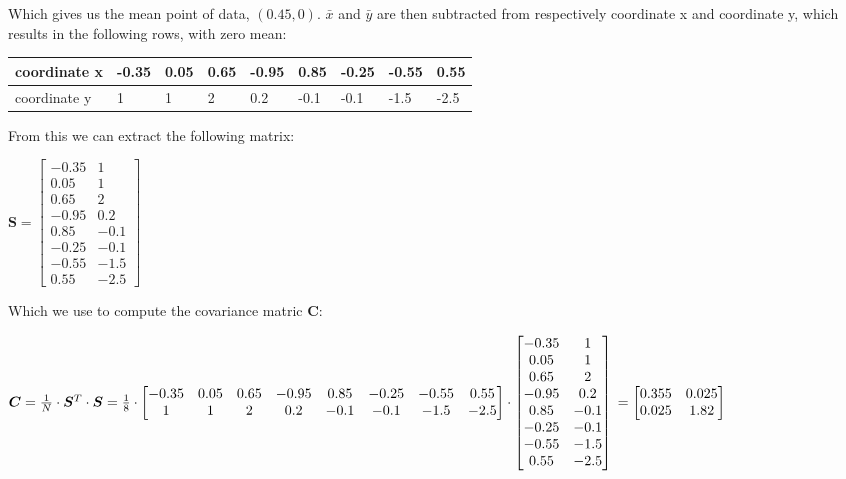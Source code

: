 \documentclass{report}
\begin{document}
\noindent Which gives us the mean point of data, $(0.45, 0)$. $\bar{x}$ and $\bar{y}$ are then subtracted from respectively coordinate x and coordinate y, which results in the following rows, with zero mean:
\begin{center}
    \begin{tabular}{|l|l|l|l|l|l|l|l|l|}
        \hline
        coordinate x & -0.35 & 0.05 & 0.65 & -0.95 & 0.85 & -0.25 & -0.55 & 0.55 \\
        \hline
        coordinate y & 1 & 1 & 2 & 0.2 & -0.1 & -0.1 & -1.5 & -2.5 \\
        \hline
    \end{tabular}
\end{center}
From this we can extract the following matrix:
\begin{center}
    \begin{math}
        \bm{S} = 
        \begin{bmatrix}
            -0.35 & 1 \\
            0.05 & 1 \\
            0.65 & 2 \\
            -0.95 & 0.2 \\
            0.85 & -0.1 \\
            -0.25 & -0.1 \\
            -0.55 & -1.5 \\
            0.55 & -2.5
        \end{bmatrix}
    \end{math}
\end{center}
Which we use to compute the covariance matric $\bm{C}$:
\begin{center}
    \begin{math}
        \bm{C} = \frac{1}{N} \cdot \bm{S}^T \cdot \bm{S}
        = \frac{1}{8} \cdot 
        \begin{bmatrix}
            -0.35 & 0.05 & 0.65 & -0.95 & 0.85 & -0.25 & -0.55 & 0.55 \\
            1 & 1 & 2 & 0.2 & -0.1 & -0.1 & -1.5 & -2.5
        \end{bmatrix}
        \cdot 
        \begin{bmatrix}
            -0.35 & 1 \\
            0.05 & 1 \\
            0.65 & 2 \\
            -0.95 & 0.2 \\
            0.85 & -0.1 \\
            -0.25 & -0.1 \\
            -0.55 & -1.5 \\
            0.55 & -2.5
        \end{bmatrix} \newline
        =
        \begin{bmatrix}
            0.355 & 0.025 \\
            0.025 & 1.82
        \end{bmatrix}
    \end{math}
\end{center}
\end{document}
